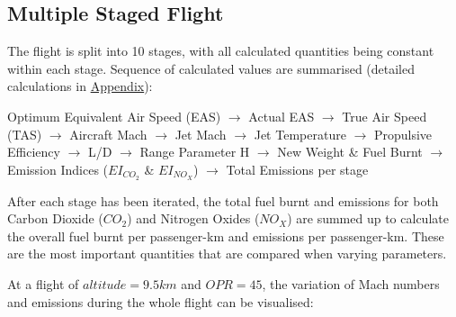 \documentclass[12pt, a4paper]{article}
\begin{document}
\subsection{Multiple Staged Flight}
The flight is split into 10 stages, with all calculated quantities being constant within each stage. Sequence of calculated values are summarised (detailed calculations in \hyperref[sec:Appendix]{Appendix}):

Optimum Equivalent Air Speed (EAS) $\rightarrow$ Actual EAS $\rightarrow$ True Air Speed (TAS) $\rightarrow$ Aircraft Mach $\rightarrow$ Jet Mach $\rightarrow$ Jet Temperature $\rightarrow$ Propulsive Efficiency $\rightarrow$ L/D $\rightarrow$ Range Parameter H $\rightarrow$ New Weight \& Fuel Burnt $\rightarrow$ Emission Indices ($EI_{CO_2}$ \& $EI_{NO_X}$) $\rightarrow$ Total Emissions per stage

After each stage has been iterated, the total fuel burnt and emissions for both Carbon Dioxide ($CO_2$) and Nitrogen Oxides ($NO_X$) are summed up to calculate the overall fuel burnt per passenger-km and emissions per passenger-km. These are the most important quantities that are compared when varying parameters. 

At a flight of $altitude = 9.5km$ and $OPR = 45$, the variation of Mach numbers and emissions during the whole flight can be visualised: 
\end{document}
